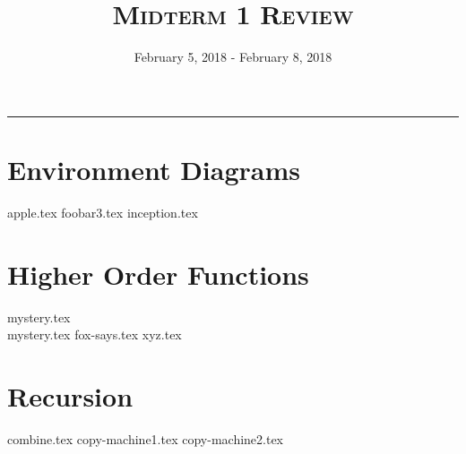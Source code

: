 \documentclass{exam}
\title{\textsc{Midterm 1 Review}}
\date{February 5, 2018 - February 8, 2018}
\begin{document}
\maketitle
\rule{\textwidth}{0.15em}
\fontsize{12}{15}\selectfont


\section{Environment Diagrams}
\begin{questions}
{apple.tex}
\newpage
{foobar3.tex}
\newpage
{inception.tex}
\end{questions}

\newpage
\section{Higher Order Functions}
\begin{questions}
{mystery.tex}
\\[4\baselineskip]
{mystery.tex}
\newpage
{fox-says.tex}
{xyz.tex}
\end{questions}

\newpage
\section{Recursion}
\begin{questions}
{combine.tex}
{copy-machine1.tex}
{copy-machine2.tex}
\end{questions}
\end{document}
